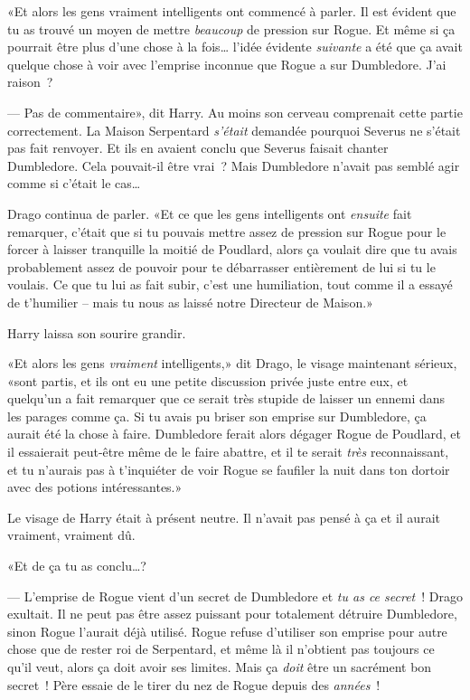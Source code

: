 «Et alors les gens vraiment intelligents ont commencé à parler. Il est évident que tu as trouvé un moyen de mettre \emph{beaucoup} de pression sur Rogue. Et même si ça pourrait être plus d'une chose à la fois… l'idée évidente \emph{suivante} a été que ça avait quelque chose à voir avec l'emprise inconnue que Rogue a sur Dumbledore. J'ai raison~?

--- Pas de commentaire», dit Harry. Au moins son cerveau comprenait cette partie correctement. La Maison Serpentard \emph{s'était} demandée pourquoi Severus ne s'était pas fait renvoyer. Et ils en avaient conclu que Severus faisait chanter Dumbledore. Cela pouvait-il être vrai~? Mais Dumbledore n'avait pas semblé agir comme si c'était le cas…

Drago continua de parler. «Et ce que les gens intelligents ont \emph{ensuite} fait remarquer, c'était que si tu pouvais mettre assez de pression sur Rogue pour le forcer à laisser tranquille la moitié de Poudlard, alors ça voulait dire que tu avais probablement assez de pouvoir pour te débarrasser entièrement de lui si tu le voulais. Ce que tu lui as fait subir, c'est une humiliation, tout comme il a essayé de t'humilier -- mais tu nous as laissé notre Directeur de Maison.»

Harry laissa son sourire grandir.

«Et alors les gens \emph{vraiment} intelligents,» dit Drago, le visage maintenant sérieux, «sont partis, et ils ont eu une petite discussion privée juste entre eux, et quelqu'un a fait remarquer que ce serait très stupide de laisser un ennemi dans les parages comme ça. Si tu avais pu briser son emprise sur Dumbledore, ça aurait été la chose à faire. Dumbledore ferait alors dégager Rogue de Poudlard, et il essaierait peut-être même de le faire abattre, et il te serait \emph{très} reconnaissant, et tu n'aurais pas à t'inquiéter de voir Rogue se faufiler la nuit dans ton dortoir avec des potions intéressantes.»

Le visage de Harry était à présent neutre. Il n'avait pas pensé à ça et il aurait vraiment, vraiment dû.

«Et de ça tu as conclu…?

--- L'emprise de Rogue vient d'un secret de Dumbledore et \emph{tu as ce secret}~! Drago exultait. Il ne peut pas être assez puissant pour totalement détruire Dumbledore, sinon Rogue l'aurait déjà utilisé. Rogue refuse d'utiliser son emprise pour autre chose que de rester roi de Serpentard, et même là il n'obtient pas toujours ce qu'il veut, alors ça doit avoir ses limites. Mais ça \emph{doit} être un sacrément bon secret~! Père essaie de le tirer du nez de Rogue depuis des \emph{années}~!

